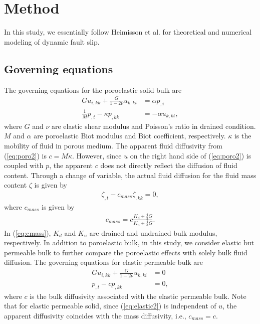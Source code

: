 \section{Method}
\label{sec:method}
In this study, 
we essentially follow Heimisson et al. \cite{Elias_2021, Elias_Shengduo_2022} for theoretical and numerical modeling of dynamic fault slip.
\subsection{Governing equations}
The governing equations for the poroelastic solid bulk are
\begin{align}
    Gu_{i,kk}+\frac{G}{1-2\nu}u_{k,ki}&=\alpha p_{,i} \label{eq:poro1}\\
    \frac{1}{M}p_{,t}-\kappa p_{,kk}&=-\alpha u_{k,kt} \label{eq:poro2}, 
\end{align}
where $G$ and $\nu$ are elastic shear modulus and Poisson's ratio in drained condition.
$M$ and $\alpha$ are poroelastic Biot modulus and Biot coefficient, 
respectively.
$\kappa$ is the mobility of fluid in porous medium. 
The apparent fluid diffusivity from (\ref{eq:poro2}) is $c = M \kappa$. 
However, 
since $u$ on the right hand side of (\ref{eq:poro2}) is coupled with $p$, 
the apparent $c$ does not directly reflect the diffusion of fluid content. 
Through a change of variable, 
the actual fluid diffusion for the fluid mass content $\zeta$ is given by \cite{Rice_1998_notes}
\begin{align}
    \zeta_{,t} - c_{mass} \zeta_{, kk} = 0 \label{eq:massDiffusion}, 
\end{align}
where $c_{mass}$ is given by 
\begin{align}
    c_{mass} = c \frac{K_d+\frac{4}{3} G}{K_u + \frac{4}{3} G} \label{eq:cmass}. 
\end{align}
In (\ref{eq:cmass}), 
$K_d$ and $K_u$ are drained and undrained bulk modulus, 
respectively. 
In addition to poroelastic bulk, 
in this study, 
we consider elastic but permeable bulk to further compare the poroelastic effects with solely bulk fluid diffusion.
The governing equations for elastic permeable bulk are 
\begin{align}
    Gu_{i,kk}+\frac{G}{1-2\nu}u_{k,ki}&=0 \label{eq:elastic1}\\
    p_{,t} - c p_{,kk}&= 0\label{eq:elastic2}, 
\end{align}
where $c$ is the bulk diffusivity associated with the elastic permeable bulk. 
Note that for elastic permeable solid, 
since (\ref{eq:elastic2}) is independent of $u$, 
the apparent diffusivity coincides with the mass diffusivity, i.e., 
$c_{mass} = c$. 

